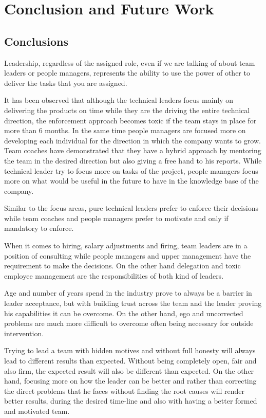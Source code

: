 \chapter{Conclusion and Future Work}
\label{sec:con-fut}

\section{Conclusions}
Leadership, regardless of the assigned role, even if we are talking of about team leaders or people managers, represents the ability to use the power of other to deliver the tasks that you are assigned. 

It has been observed that although the technical leaders focus mainly on delivering the products on time while they are the driving the entire technical direction, the enforcement approach becomes toxic if the team stays in place for more than 6 months. In the same time people managers are focused more on developing each individual for the direction in which the company wants to grow. Team coaches have demonstrated that they have a hybrid approach by mentoring the team in the desired direction but also giving a free hand to his reports. While technical leader try to focus more on tasks of the project, people managers focus more on what would be useful in the future to have in the knowledge base of the company.

Similar to the focus areas, pure technical leaders prefer to enforce their decisions while team coaches and people managers prefer to motivate and only if mandatory to enforce.

When it comes to hiring, salary adjustments and firing, team leaders are in a position of consulting while people managers and upper management have the requirement to make the decisions. On the other hand delegation and toxic employee management are the responsibilities of both kind of leaders.

Age and number of years spend in the industry prove to always be a barrier in leader acceptance, but with building trust across the team and the leader proving his capabilities it can be overcome. On the other hand, ego and uncorrected problems are much more difficult to overcome often being necessary for outside intervention.

Trying to lead a team with hidden motives and without full honesty will always lead to different results than expected. Without being completely open, fair and also firm, the expected result will also be different than expected. On the other hand, focusing more on how the leader can be better and rather than correcting the direct problems that he faces without finding the root causes will render better results, during the desired time-line and also with having a better formed and motivated team.

